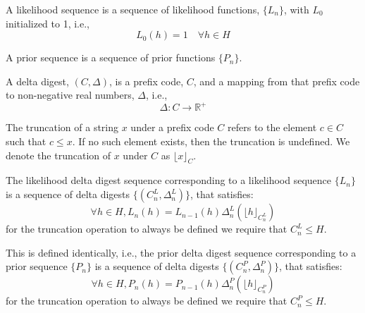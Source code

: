 \begin{definition}
\label{def:likelihood-sequence}
    A likelihood sequence is a sequence of likelihood functions, $\{L_n\}$, with $L_0$ initialized to 1,
    i.e.,
    $$
    L_0(h) = 1 \quad \forall h \in H
    $$
\end{definition}

\begin{definition}
    A prior sequence is a sequence of prior functions $\{P_n\}$.
\end{definition}

\begin{definition}
    A delta digest, $(C, \Delta)$, is a prefix code, $C$, and a mapping from that prefix code to non-negative real numbers, $\Delta$,
    i.e.,
    $$
    \Delta : C \to \mathbb{R}^+
    $$
\end{definition}

\begin{definition}
    The truncation of a string $x$ under a prefix code $C$ refers to the
    element $c \in C$ such that $c \leq x$.
    If no such element exists, then the truncation is undefined.
    We denote the truncation of $x$ under $C$ as $\lfloor x \rfloor_C$.
\end{definition}

\begin{definition}
    The likelihood delta digest sequence corresponding to a likelihood sequence $\{L_n\}$ is a sequence of delta digests $\{(C^L_n, \Delta^L_n)\}$,
    that satisfies:
    $$
    \forall h \in H, L_n(h) = L_{n-1}(h) \Delta^L_n(\lfloor h \rfloor_{C^L_n})
    $$
    for the truncation operation to always be defined
    we require that $C^L_n \leq H$.
\end{definition}

\begin{definition}
    This is defined identically,
    i.e.,
    the prior delta digest sequence corresponding to a prior sequence $\{P_n\}$ is a sequence of delta digests $\{(C^P_n, \Delta^P_n)\}$,
    that satisfies:
    $$
    \forall h \in H, P_n(h) = P_{n-1}(h) \Delta^P_n(\lfloor h \rfloor_{C^P_n})
    $$
    for the truncation operation to always be defined
    we require that $C^P_n \leq H$.
\end{definition}

